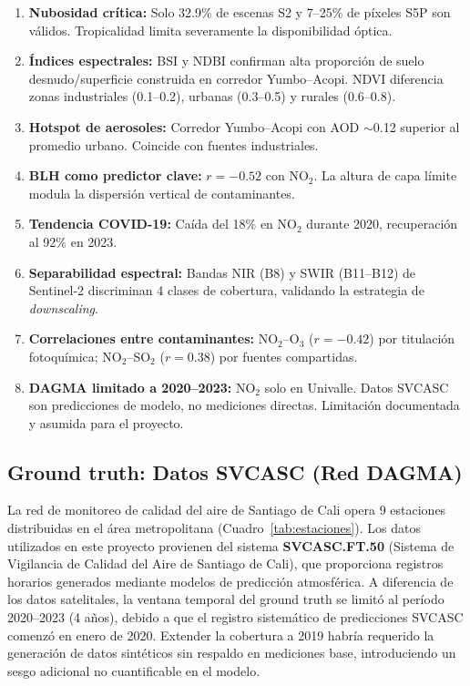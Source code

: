 \documentclass[10pt,a4paper,twocolumn]{article}
\begin{document}
\begin{enumerate}[nosep, leftmargin=*, itemsep=2pt]
  \item \textbf{Nubosidad crítica:} Solo 32.9\% de escenas S2 y 7--25\% de píxeles S5P son válidos. Tropicalidad limita severamente la disponibilidad óptica.
  \item \textbf{Índices espectrales:} BSI y NDBI confirman alta proporción de suelo desnudo/superficie construida en corredor Yumbo--Acopi. NDVI diferencia zonas industriales (0.1--0.2), urbanas (0.3--0.5) y rurales (0.6--0.8).
  \item \textbf{Hotspot de aerosoles:} Corredor Yumbo--Acopi con AOD $\sim$0.12 superior al promedio urbano. Coincide con fuentes industriales.
  \item \textbf{BLH como predictor clave:} $r = -0.52$ con NO$_2$. La altura de capa límite modula la dispersión vertical de contaminantes.
  \item \textbf{Tendencia COVID-19:} Caída del 18\% en NO$_2$ durante 2020, recuperación al 92\% en 2023.
  \item \textbf{Separabilidad espectral:} Bandas NIR (B8) y SWIR (B11--B12) de Sentinel-2 discriminan 4 clases de cobertura, validando la estrategia de \textit{downscaling}.
  \item \textbf{Correlaciones entre contaminantes:} NO$_2$--O$_3$ ($r = -0.42$) por titulación fotoquímica; NO$_2$--SO$_2$ ($r = 0.38$) por fuentes compartidas.
  \item \textbf{DAGMA limitado a 2020--2023:} NO$_2$ solo en Univalle. Datos SVCASC son predicciones de modelo, no mediciones directas. Limitación documentada y asumida para el proyecto.
\end{enumerate}

\subsection{Ground truth: Datos SVCASC (Red DAGMA)}

La red de monitoreo de calidad del aire de Santiago de Cali opera 9 estaciones distribuidas en el área metropolitana (Cuadro~\ref{tab:estaciones}). Los datos utilizados en este proyecto provienen del sistema \textbf{SVCASC.FT.50} (Sistema de Vigilancia de Calidad del Aire de Santiago de Cali), que proporciona registros horarios generados mediante modelos de predicción atmosférica. A diferencia de los datos satelitales, la ventana temporal del ground truth se limitó al período 2020--2023 (4 años), debido a que el registro sistemático de predicciones SVCASC comenzó en enero de 2020. Extender la cobertura a 2019 habría requerido la generación de datos sintéticos sin respaldo en mediciones base, introduciendo un sesgo adicional no cuantificable en el modelo.
\end{document}
